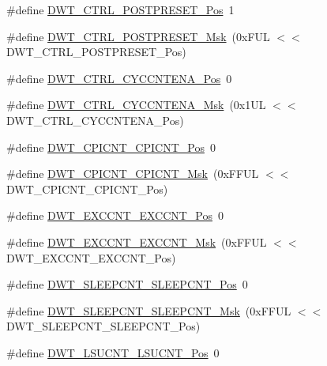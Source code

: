 \begin{DoxyCompactItemize}
\#define \hyperlink{group__CMSIS__DWT_ga129bc152febfddd67a0c20c6814cba69}{D\-W\-T\-\_\-\-C\-T\-R\-L\-\_\-\-P\-O\-S\-T\-P\-R\-E\-S\-E\-T\-\_\-\-Pos}~1
\item 
\#define \hyperlink{group__CMSIS__DWT_ga11d9e1e2a758fdd2657aa68ce61b9c9d}{D\-W\-T\-\_\-\-C\-T\-R\-L\-\_\-\-P\-O\-S\-T\-P\-R\-E\-S\-E\-T\-\_\-\-Msk}~(0x\-F\-U\-L $<$$<$ D\-W\-T\-\_\-\-C\-T\-R\-L\-\_\-\-P\-O\-S\-T\-P\-R\-E\-S\-E\-T\-\_\-\-Pos)
\item 
\#define \hyperlink{group__CMSIS__DWT_gaa4509f5f8514a7200be61691f0e01f10}{D\-W\-T\-\_\-\-C\-T\-R\-L\-\_\-\-C\-Y\-C\-C\-N\-T\-E\-N\-A\-\_\-\-Pos}~0
\item 
\#define \hyperlink{group__CMSIS__DWT_ga4a9d209dc2a81ea6bfa0ea21331769d3}{D\-W\-T\-\_\-\-C\-T\-R\-L\-\_\-\-C\-Y\-C\-C\-N\-T\-E\-N\-A\-\_\-\-Msk}~(0x1\-U\-L $<$$<$ D\-W\-T\-\_\-\-C\-T\-R\-L\-\_\-\-C\-Y\-C\-C\-N\-T\-E\-N\-A\-\_\-\-Pos)
\item 
\#define \hyperlink{group__CMSIS__DWT_ga80e9ad8f6a9e2344af8a3cf989bebe3d}{D\-W\-T\-\_\-\-C\-P\-I\-C\-N\-T\-\_\-\-C\-P\-I\-C\-N\-T\-\_\-\-Pos}~0
\item 
\#define \hyperlink{group__CMSIS__DWT_ga76f39e7bca3fa86a4dbf7b8f6adb7217}{D\-W\-T\-\_\-\-C\-P\-I\-C\-N\-T\-\_\-\-C\-P\-I\-C\-N\-T\-\_\-\-Msk}~(0x\-F\-F\-U\-L $<$$<$ D\-W\-T\-\_\-\-C\-P\-I\-C\-N\-T\-\_\-\-C\-P\-I\-C\-N\-T\-\_\-\-Pos)
\item 
\#define \hyperlink{group__CMSIS__DWT_ga031c693654030d4cba398b45d2925b1d}{D\-W\-T\-\_\-\-E\-X\-C\-C\-N\-T\-\_\-\-E\-X\-C\-C\-N\-T\-\_\-\-Pos}~0
\item 
\#define \hyperlink{group__CMSIS__DWT_ga057fa604a107b58a198bbbadb47e69c9}{D\-W\-T\-\_\-\-E\-X\-C\-C\-N\-T\-\_\-\-E\-X\-C\-C\-N\-T\-\_\-\-Msk}~(0x\-F\-F\-U\-L $<$$<$ D\-W\-T\-\_\-\-E\-X\-C\-C\-N\-T\-\_\-\-E\-X\-C\-C\-N\-T\-\_\-\-Pos)
\item 
\#define \hyperlink{group__CMSIS__DWT_ga0371a84a7996dc5852c56afb2676ba1c}{D\-W\-T\-\_\-\-S\-L\-E\-E\-P\-C\-N\-T\-\_\-\-S\-L\-E\-E\-P\-C\-N\-T\-\_\-\-Pos}~0
\item 
\#define \hyperlink{group__CMSIS__DWT_ga1e340751d71413fef400a0a1d76cc828}{D\-W\-T\-\_\-\-S\-L\-E\-E\-P\-C\-N\-T\-\_\-\-S\-L\-E\-E\-P\-C\-N\-T\-\_\-\-Msk}~(0x\-F\-F\-U\-L $<$$<$ D\-W\-T\-\_\-\-S\-L\-E\-E\-P\-C\-N\-T\-\_\-\-S\-L\-E\-E\-P\-C\-N\-T\-\_\-\-Pos)
\item 
\#define \hyperlink{group__CMSIS__DWT_gab9394c7911b0b4312a096dad91d53a3d}{D\-W\-T\-\_\-\-L\-S\-U\-C\-N\-T\-\_\-\-L\-S\-U\-C\-N\-T\-\_\-\-Pos}~0
\item 
$$
\end{DoxyCompactItemize}
